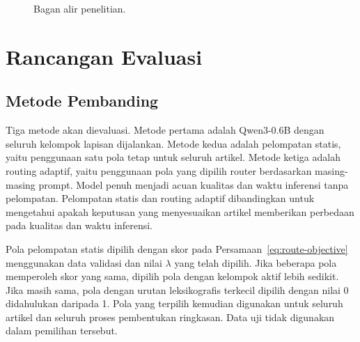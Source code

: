 \begin{figure}[H]
  \centering
  \caption{Bagan alir penelitian.}
  \label{fig:bagan-alir-routing}
\end{figure}

\section{Rancangan Evaluasi}

\subsection{Metode Pembanding}

Tiga metode akan dievaluasi. Metode pertama adalah Qwen3-0.6B dengan seluruh kelompok lapisan dijalankan. Metode kedua adalah pelompatan statis, yaitu penggunaan satu pola tetap untuk seluruh artikel. Metode ketiga adalah routing adaptif, yaitu penggunaan pola yang dipilih router berdasarkan masing-masing prompt. Model penuh menjadi acuan kualitas dan waktu inferensi tanpa pelompatan. Pelompatan statis dan routing adaptif dibandingkan untuk mengetahui apakah keputusan yang menyesuaikan artikel memberikan perbedaan pada kualitas dan waktu inferensi.

Pola pelompatan statis dipilih dengan skor pada Persamaan~\ref{eq:route-objective} menggunakan data validasi dan nilai $\lambda$ yang telah dipilih. Jika beberapa pola memperoleh skor yang sama, dipilih pola dengan kelompok aktif lebih sedikit. Jika masih sama, pola dengan urutan leksikografis terkecil dipilih dengan nilai 0 didahulukan daripada 1. Pola yang terpilih kemudian digunakan untuk seluruh artikel dan seluruh proses pembentukan ringkasan. Data uji tidak digunakan dalam pemilihan tersebut.

